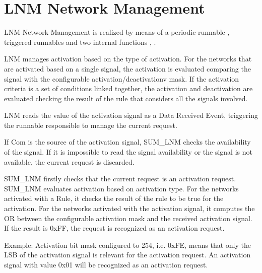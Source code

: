\section{LNM Network Management}
\label{sec:lnm_network_management}
LNM Network Management is realized by means of a periodic runnable , triggered runnables  and two internal functions , 
.

{
LNM manages activation based on the type of activation. For the networks that are activated based on a single signal, the activation is evaluated comparing the signal with the configurable activation/deactivationv mask. If the activation criteria is a set of conditions linked together, the activation and deactivation are evaluated checking the result of the rule that considers all the signals involved.
}
{  }

{
LNM reads the value of the activation signal as a Data Received Event, triggering the runnable responsible to manage the current request.
}
{}

{
If Com is the source of the activation signal, SUM_LNM checks the availability of the signal. If it is impossible to read the signal availability or the signal is not available, the current request is discarded.
}
{ }

{
SUM_LNM firstly checks that the current request is an activation request. SUM_LNM evaluates activation based on activation type. For the networks activated with a Rule, it checks the result of the rule to be true for the activation. For the networks activated with the activation signal, it computes the OR between the configurable activation mask and the received activation signal. If the result is 0xFF, the request is
recognized as an activation request. 

Example: Activation bit mask configured to 254, i.e. 0xFE, means that only the LSB of the activation signal is relevant for the activation request. 
An activation signal with value 0x01 will be recognized as an activation request.
}
{  }

